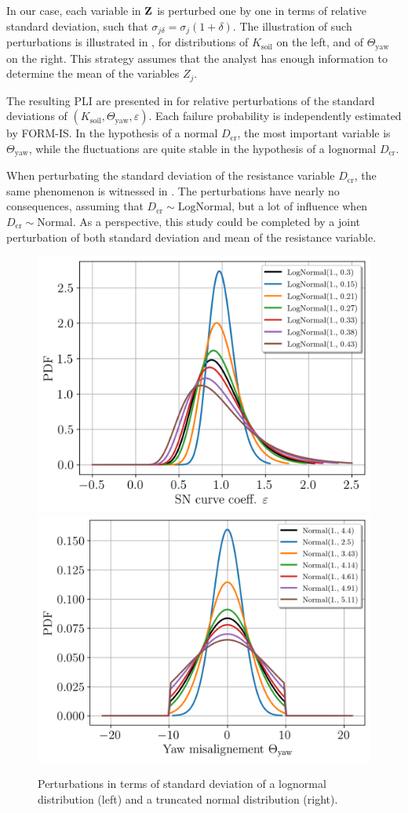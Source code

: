 In our case, each variable in ${\bf Z}$ is perturbed one by one in terms of relative standard deviation, such that $\sigma_{j \delta} = \sigma_j (1+\delta)$. 
The illustration of such perturbations is illustrated in , for distributions of $K_{\mathrm{soil}}$ on the left, and of $\Theta_{\mathrm{yaw}}$ on the right.
This strategy assumes that the analyst has enough information to determine the mean of the variables $Z_j$. 

The resulting PLI are presented in  for relative perturbations of the standard deviations of $(K_{\mathrm{soil}}, \Theta_{\mathrm{yaw}}, \varepsilon)$. 
Each failure probability is independently estimated by FORM-IS. 
In the hypothesis of a normal $D_{\mathrm{cr}}$, the most important variable is $\Theta_{\mathrm{yaw}}$, while the fluctuations are quite stable in the hypothesis of a lognormal $D_{\mathrm{cr}}$. 

When perturbating the standard deviation of the resistance variable $D_{\mathrm{cr}}$, the same phenomenon is witnessed in . 
The perturbations have nearly no consequences, assuming that $D_{\mathrm{cr}}\sim \mathrm{LogNormal}$, but a lot of influence when $D_{\mathrm{cr}}\sim \mathrm{Normal}$.  
As a perspective, this study could be completed by a joint perturbation of both standard deviation and mean of the resistance variable.


\begin{figure}
    \centering
        \includegraphics[width=0.43\linewidth]{./part3/figures/OWT/lognormal_pert.png}
        \includegraphics[width=0.44\linewidth]{./part3/figures/OWT/normal_pert.png}
    \caption{Perturbations in terms of standard deviation of a lognormal distribution (left) and a truncated normal distribution (right).}
    \label{fig:perturbations}
\end{figure}


